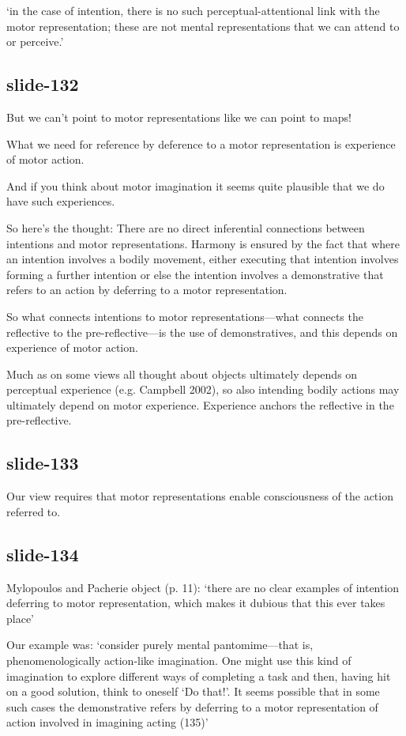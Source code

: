 \documentclass[12pt,\papersize]{extarticle}
\begin{document}
‘in the case of intention, there is no such perceptual-attentional link with the motor representation; these are not mental representations that we can attend to or perceive.’

\subsection{slide-132}
But we can’t point to motor representations like we can point to maps!

What we need for reference by deference to a motor representation is
experience of motor action.

And if you think about motor imagination it seems quite plausible that we
do have such experiences.

So here’s the thought:
There are no direct inferential connections between intentions and motor
representations. Harmony is ensured by the fact that where an intention
involves a bodily movement, either executing that intention involves
forming a further intention or else the intention involves a demonstrative
that refers to an action by deferring to a motor representation.

So what connects intentions to motor representations---what connects the reflective to the
pre-reflective---is the use of demonstratives, and this depends on experience of motor
action.

Much as on some views all thought about objects ultimately depends on
perceptual experience (e.g. Campbell 2002), so also intending bodily
actions may ultimately depend on motor experience. Experience anchors the
reflective in the pre-reflective.

\subsection{slide-133}
Our view requires that motor representations enable consciousness of the
action referred to.

\subsection{slide-134}
Mylopoulos and Pacherie object (p. 11): ‘there are no clear examples of intention deferring
to motor representation, which makes it dubious that this ever takes place’

Our example was: ‘consider purely mental pantomime—that is, phenomenologically
action-like imagination. One might use this kind of imagination to explore
different ways of completing a task and then, having hit on a good
solution, think to oneself ‘Do that!’. It seems possible that in some such
cases the demonstrative refers by deferring to a motor representation of
action involved in imagining acting (135)’
\end{document}

